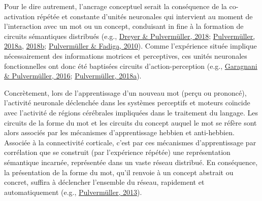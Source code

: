 \documentclass[
  a4paper,12pt,twoside,onecolumn,openright,final,oldfontcommands]{memoir}
\begin{document}
Pour le dire autrement, l'ancrage conceptuel serait la conséquence de la co-activation répétée et constante d'unités neuronales qui intervient au moment de l'interaction avec un mot ou un concept, conduisant in fine à la formation de circuits sémantiques distribués (e.g., \protect\hyperlink{ref-dreyer_abstract_2018}{Dreyer \& Pulvermüller, 2018}; \protect\hyperlink{ref-pulvermuller_neural_2018}{Pulvermüller, 2018a}, \protect\hyperlink{ref-pulvermuller_neurobiological_2018}{2018b}; \protect\hyperlink{ref-pulvermuller_active_2010}{Pulvermüller \& Fadiga, 2010}). Comme l'expérience située implique nécessairement des informations motrices et perceptives, ces unités neuronales fonctionnelles ont donc été baptisées circuits d'action-perception (e.g., \protect\hyperlink{ref-garagnani_conceptual_2016}{Garagnani \& Pulvermüller, 2016}; \protect\hyperlink{ref-pulvermuller_neural_2018}{Pulvermüller, 2018a}).

Concrètement, lors de l'apprentissage d'un nouveau mot (perçu ou prononcé), l'activité neuronale déclenchée dans les systèmes perceptifs et moteurs coïncide avec l'activité de régions cérébrales impliquées dans le traitement du langage. Les circuits de la forme du mot et les circuits du concept auquel le mot se réfère sont alors associés par les mécanismes d'apprentissage hebbien et anti-hebbien. Associée à la connectivité corticale, c'est par ces mécanismes d'apprentissage par corrélation que se construit (par l'expérience répétée) une représentation sémantique incarnée, représentée dans un vaste réseau distribué. En conséquence, la présentation de la forme du mot, qu'il renvoie à un concept abstrait ou concret, suffira à déclencher l'ensemble du réseau, rapidement et automatiquement (e.g., \protect\hyperlink{ref-pulvermuller_how_2013}{Pulvermüller, 2013}).
\end{document}
